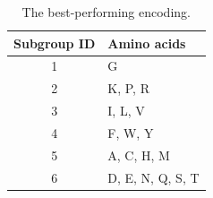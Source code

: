 \documentclass[a4,center,fleqn]{NAR}
\begin{document}
\begin{table}[ht]
\centering
\caption{The best-performing encoding.} 
\label{tab:best_enc}
\begin{tabular}{cl}
\toprule
Subgroup ID & Amino acids \\ 
\midrule
  1 & G \\ 
\rowcolor[gray]{0.85}  2 & K, P, R \\ 
3 & I, L, V \\ 
\rowcolor[gray]{0.85}  4 & F, W, Y \\ 
5 & A, C, H, M \\ 
\rowcolor[gray]{0.85}  6 & D, E, N, Q, S, T \\ 
\bottomrule
\end{tabular}
\end{table}
\end{document}
